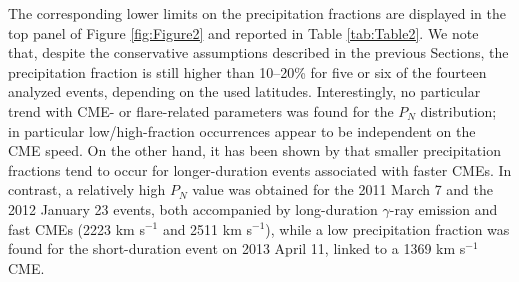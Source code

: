 \documentclass{aastex61}
\begin{document}
The corresponding lower limits on the precipitation fractions are displayed in the top panel of Figure \ref{fig:Figure2} and reported in Table \ref{tab:Table2}.
We note that, despite the conservative assumptions described in the previous Sections, the precipitation fraction is still higher than 10--20\% for five or six of the fourteen analyzed events, depending on the used latitudes. 
Interestingly, no particular trend with CME- or flare-related parameters was found for the $P_{N}$ distribution; in particular low/high-fraction occurrences appear to be independent on the CME speed. On the other hand,
it has been shown by \citet{ref:HUTCHINSON2022} that smaller precipitation fractions tend to occur for longer-duration events associated with faster CMEs.
In contrast, 
a relatively high $P_{N}$ value was obtained for the 2011 March 7 and the 2012 January 23 events, both accompanied by long-duration $\gamma$-ray emission and fast CMEs (2223 km s$^{-1}$ and 2511 km s$^{-1}$), while a low precipitation fraction was found for the short-duration event on 2013 April 11, linked to a 1369 km s$^{-1}$ CME.
\end{document}
